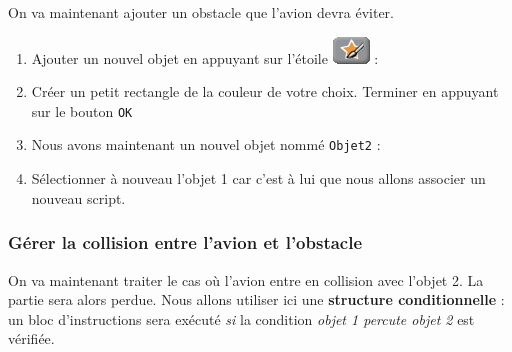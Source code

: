 On va maintenant ajouter un obstacle que l'avion devra éviter.

\begin{enumerate}
\item Ajouter un nouvel objet en appuyant sur l'étoile \includegraphics[width=.7cm]{./images/scratch/EtoilePinceau} :
\item Créer un petit rectangle de la couleur de votre choix.
Terminer en appuyant sur le bouton \texttt{OK}
\item Nous avons maintenant un nouvel objet nommé \texttt{Objet2} :
\item Sélectionner à nouveau l'objet 1 car c'est à lui que nous allons associer un nouveau script.
\end{enumerate}


\subsubsection{Gérer la collision entre l'avion et l'obstacle} 

On va maintenant traiter le cas où l'avion entre en collision avec l'objet 2. La partie sera alors perdue. Nous allons utiliser ici une \textbf{structure conditionnelle} : un bloc d'instructions sera exécuté \emph{si} la condition \emph{objet 1 percute objet 2} est vérifiée. 

\vspace{12pt}


\vspace{12pt}





